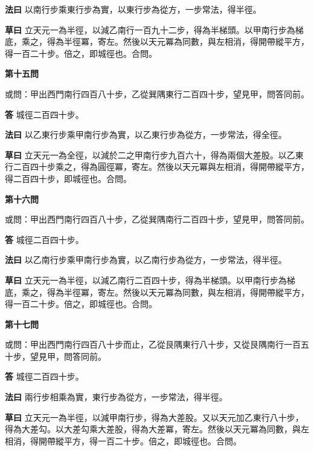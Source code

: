 \documentclass[11pt,a4paper]{article}
\newcommand{\problem}[1]{\par\noindent\textbf{\color{problemcolor}#1}\par\nopagebreak}
\newcommand{\answer}[1]{\par\noindent\textbf{答} #1\par}
\newcommand{\method}[1]{\par\noindent\textbf{法曰} #1\par}
\newcommand{\workings}[1]{\par\noindent\textbf{草曰} #1\par}
\begin{document}
\method{以南行步乘東行步為實，以東行步為從方，一步常法，得半徑。}

\workings{立天元一為半徑，以減乙南行一百九十二步，得為半梯頭。以甲南行步為梯底，乘之，得為半徑冪，寄左。然後以天元冪為同數，與左相消，得開帶縱平方，得一百二十步。倍之，即城徑也。合問。}

\vspace{0.5cm}

\problem{第十五問}

\noindent 或問：甲出西門南行四百八十步，乙從巽隅東行二百四十步，望見甲，問答同前。

\answer{城徑二百四十步。}

\method{以乙東行步乘甲南行步為實，以乙東行步為從方，一步常法，得全徑。}

\workings{立天元一為全徑，以減於二之甲南行步九百六十，得為兩個大差股。以乙東行二百四十步乘之，得為圓徑冪，寄左。然後以天元冪與左相消，得開帶縱平方，得二百四十步，即城徑也。合問。}

\vspace{0.5cm}

\problem{第十六問}

\noindent 或問：甲出西門南行四百八十步，乙從巽隅南行二百四十步，望見甲，問答同前。

\answer{城徑二百四十步。}

\method{以乙南行步乘甲南行步為實，以乙南行步為從方，一步常法，得半徑。}

\workings{立天元一為半徑，以減乙南行二百四十步，得為半梯頭。以甲南行步為梯底，乘之，得為半徑冪，寄左。然後以天元冪為同數，與左相消，得開帶縱平方，得一百二十步。倍之，即城徑也。合問。}

\vspace{0.5cm}

\problem{第十七問}

\noindent 或問：甲出西門南行四百八十步而止，乙從艮隅東行八十步，又從艮隅南行一百五十步，望見甲，問答同前。

\answer{城徑二百四十步。}

\method{兩行步相乘為實，東行步為從方，一步常法，得半徑。}

\workings{立天元一為半徑，以減甲南行步，得為大差股。又以天元加乙東行八十步，得為大差勾。以大差勾乘大差股，得為大差冪，寄左。然後以天元冪為同數，與左相消，得開帶縱平方，得一百二十步。倍之，即城徑也。合問。}
\end{document}
